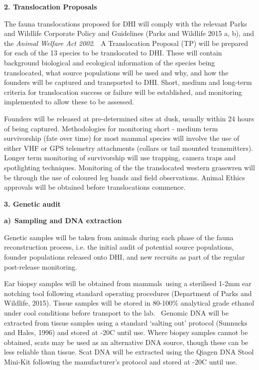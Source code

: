 \documentclass[version=last,
    paper=a4,                               %
    10pt,                                   %
    dvipsnames,
    oneside,                              %
    headings=openany,                       %
    open=any,
    BCOR=7mm,                               %
    DIV=15,     %
]{scrbook}
\begin{document}
\textbf{2. Translocation Proposals}

The fauna translocations proposed for DHI will comply with the relevant
Parks and Wildlife Corporate Policy and Guidelines (Parks and Wildlife
2015 a, b), and the \emph{Animal Welfare Act 2002}. ~A Translocation
Proposal (TP) will be prepared for each of the 13 species to be
translocated to DHI. These will contain background biological and
ecological information of the species being translocated, what source
populations will be used and why, and how the founders will be captured
and transported to DHI. Short, medium and long-term criteria for
translocation success or failure will be established, and monitoring
implemented to allow these to be assessed.

Founders will be released at pre-determined sites at dusk, usually
within 24 hours of being captured. Methodologies for monitoring short -
medium term survivorship (fate over time) for most mammal species will
involve the use of either VHF or GPS telemetry attachments (collars or
tail mounted transmitters). Longer term monitoring of survivorship will
use trapping, camera traps and spotlighting techniques. Monitoring of
the the translocated western grasswren will be through the use of
coloured leg bands and field observations. Animal Ethics approvals will
be obtained before translocations commence.

\textbf{3. Genetic audit}

\textbf{a)}~\textbf{Sampling and DNA extraction}

Genetic samples will be taken from animals during each phase of the
fauna reconstruction process, i.e. the initial audit of potential source
populations, founder populations released onto DHI, and new recruits as
part of the regular post-release monitoring.

Ear biopsy samples will be obtained from mammals~using a sterilised
1-2mm ear notching tool following standard operating procedures
(Department of Parks and Wildlife, 2015). Tissue samples will be stored
in 80-100\% analytical grade ethanol under cool conditions before
transport to the lab.~ Genomic DNA will be extracted from tissue samples
using a standard `salting out' protocol (Sunnucks and Hales, 1996) and
stored at -20C until use. Where biopsy samples cannot be obtained, scats
may be used as an alternative DNA source, though these can be less
reliable than tissue. Scat DNA will be extracted using the Qiagen DNA
Stool Mini-Kit following the manufacturer's protocol and stored at -20C
until use.
\end{document}
